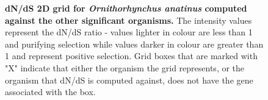 \documentclass{article}
\begin{document}
\begin{figure}[H]
\centering
{}
\caption{\textbf{dN/dS 2D grid for \textit{Ornithorhynchus anatinus} computed against the other significant organisms.} The intensity values represent the dN/dS ratio - values lighter in colour are less than 1 and purifying selection while values darker in colour are greater than 1 and represent positive selection. Grid boxes that are marked with "X" indicate that either the organism the grid represents, or the organism that dN/dS is computed against, does not have the gene associated with the box.}
\label{sup_fig_30}
\end{figure}
\end{document}
